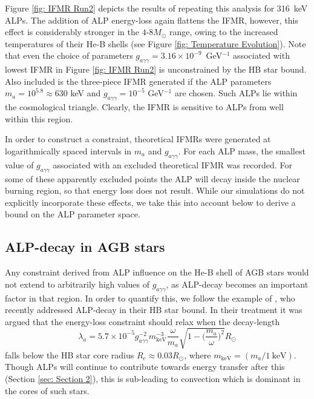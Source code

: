  Figure \ref{fig: IFMR Run2} depicts the results of repeating this analysis for 316~keV ALPs. The addition of ALP energy-loss again flattens the IFMR, however, this effect is considerably stronger in the $4$-$8M_{\odot}$ range, owing to the increased temperatures of their He-B shells (see Figure \ref{fig: Temperature Evolution}). Note that even the choice of parameters $g_{a\gamma\gamma}=3.16\times10^{-9}$~GeV$^{-1}$ associated with lowest IFMR in Figure \ref{fig: IFMR Run2} is unconstrained by the HB star bound. Also included is the three-piece IFMR generated if the ALP parameters $m_a=10^{5.8}\approx630$ keV and $g_{a\gamma\gamma}=10^{-5}$ GeV$^{-1}$ are chosen. Such ALPs lie within the cosmological triangle. Clearly, the IFMR is sensitive to ALPs from well within this region.
 
 
 
In order to construct a constraint, theoretical IFMRs were generated at logarithmically spaced intervals in $m_a$ and $g_{a\gamma\gamma}$. For each ALP mass, the smallest value of $g_{a\gamma\gamma}$ associated with an excluded theoretical IFMR was recorded. For some of these apparently excluded points the ALP will decay inside the nuclear burning region, so that energy loss does not result. While our simulations do not explicitly incorporate these effects, we take this into account below to derive a bound on the ALP parameter space.

\subsection{ALP-decay in AGB stars}
Any constraint derived from ALP influence on the He-B shell of AGB stars would not extend to arbitrarily high values of $g_{a\gamma\gamma}$, as ALP-decay becomes an important factor in that region. In order to quantify this, we follow the example of \cite{Carenza:2020zil}, who recently addressed ALP-decay in their HB star bound. In their treatment it was argued that the energy-loss constraint should relax when the decay-length
\begin{equation}
    \lambda_a=5.7\times10^{-5}g_{a\gamma\gamma}^{-2}m_{\mathrm{keV}}^{-3}\frac{\omega}{m_a}\sqrt{1-\bigg(\frac{m_a}{\omega}\bigg)^2} R_{\odot}
\end{equation}
falls below the HB star core radius $R_c\approx0.03R_{\odot}$, where $m_{\mathrm{keV}}=(m_a/1\ \mathrm{keV})$. Though ALPs will continue to contribute towards energy transfer after this (Section \ref{sec: Section 2}), this is sub-leading to convection which is dominant in the cores of such stars.


